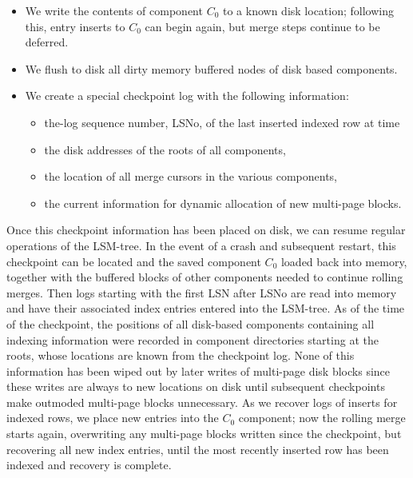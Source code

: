 \documentclass[a4paper,12pt,notitlepage,twoside,openright]{article}
\begin{document}
\begin{itemize}
\item
  We write the contents of component \(C_0\) to a known disk location;
  following this, entry inserts to \(C_0\) can begin again, but merge steps
  continue to be deferred.
\item
  We flush to disk all dirty memory buffered nodes of disk based
  components.
\item
  We create a special checkpoint log with the following information:

  \begin{itemize}
  \item

    the-log sequence number, LSNo, of the last inserted indexed row at
    time

  \item

    the disk addresses of the roots of all components,

  \item

    the location of all merge cursors in the various components,

  \item

    the current information for dynamic allocation of new multi-page
    blocks.

  \end{itemize}
\end{itemize}


Once this checkpoint information has been placed on disk, we can resume
regular operations of the LSM-tree. In the event of a crash and
subsequent restart, this checkpoint can be located and the saved
component \(C_0\) loaded back into memory, together with the buffered blocks
of other components needed to continue rolling merges. Then logs
starting with the first LSN after LSNo are read into memory and have
their associated index entries entered into the LSM-tree. As of the time
of the checkpoint, the positions of all disk-based components containing
all indexing information were recorded in component directories starting
at the roots, whose locations are known from the checkpoint log. None of
this information has been wiped out by later writes of multi-page disk
blocks since these writes are always to new locations on disk until
subsequent checkpoints make outmoded multi-page blocks unnecessary. As
we recover logs of inserts for indexed rows, we place new entries into
the \(C_0\) component; now the rolling merge starts again, overwriting any
multi-page blocks written since the checkpoint, but recovering all new
index entries, until the most recently inserted row has been indexed and
recovery is complete.
\end{document}
